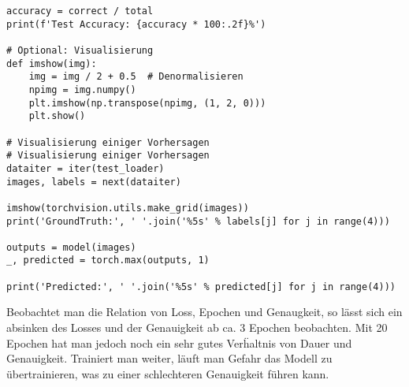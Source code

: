 \documentclass[a4paper,11pt,titlepage]{article}
\begin{document}
\begin{lstlisting}[style=python]
accuracy = correct / total
print(f'Test Accuracy: {accuracy * 100:.2f}%')

# Optional: Visualisierung
def imshow(img):
    img = img / 2 + 0.5  # Denormalisieren
    npimg = img.numpy()
    plt.imshow(np.transpose(npimg, (1, 2, 0)))
    plt.show()

# Visualisierung einiger Vorhersagen
# Visualisierung einiger Vorhersagen
dataiter = iter(test_loader)
images, labels = next(dataiter)

imshow(torchvision.utils.make_grid(images))
print('GroundTruth:', ' '.join('%5s' % labels[j] for j in range(4)))

outputs = model(images)
_, predicted = torch.max(outputs, 1)

print('Predicted:', ' '.join('%5s' % predicted[j] for j in range(4)))

\end{lstlisting}
Beobachtet man die Relation von Loss, Epochen und Genaugkeit, so l\"asst sich ein absinken des Losses und der Genauigkeit ab ca. 3 Epochen beobachten.
Mit 20 Epochen hat man jedoch noch ein sehr gutes Ver\"haltnis von Dauer und Genauigkeit.
Trainiert man weiter, l\"auft man Gefahr das Modell zu \"ubertrainieren, was zu einer schlechteren Genauigkeit f\"uhren kann.
\end{document}

